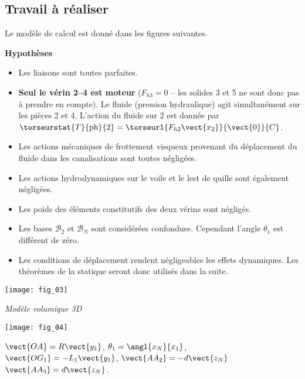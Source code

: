 \begin{multicols}{2}
\subsection*{Travail à réaliser}
\ifprof
\else

Le modèle de calcul est donné dans les figures suivantes.

\textbf{Hypothèses}

\begin{itemize}
\item Les liaisons sont toutes parfaites.
\item \textbf{Seul le vérin 2--4 est moteur} ($F_{h3}=0$ -- les solides 3 et 5 ne sont donc pas à prendre en compte). Le fluide (pression hydraulique) agit simultanément sur les pièces 2 et 4. L’action du fluide sur 2 est donnée par 
$\torseurstat{T}{\text{ph}}{2}=\torseurl{F_{h2}\vect{x_2}}{\vect{0}}{C}$.
\item Les actions mécaniques de frottement visqueux provenant du déplacement du fluide dans les canalisations sont toutes négligées.%
\item Les actions hydrodynamiques sur le voile et le lest de quille sont également négligées.
\item Les poids des éléments constitutifs des deux vérins sont négligés.
\item Les bases $\mathcal{B}_2$ et $\mathcal{B}_N$ sont considérées confondues. Cependant l’angle $\theta_1$ est différent de zéro.
\item Les conditions de déplacement rendent négligeables les effets dynamiques. Les théorèmes de la statique seront donc utilisés dans la suite.
\end{itemize}

\begin{center}
\texttt{[image: fig\_03]}

\textit{Modèle volumique 3D}
\end{center}

\begin{center}
\texttt{[image: fig\_04]}


$\vect{OA}=R\vect{y_1}$, 
$\theta_1 =\angl{x_N}{x_1}$,
$\vect{OG_1}=-L_1\vect{y_1}$,
$\vect{AA_2}=-d\vect{z_N}$
$\vect{AA_3}=d\vect{z_N} $.


\end{center}
\end{multicols}
